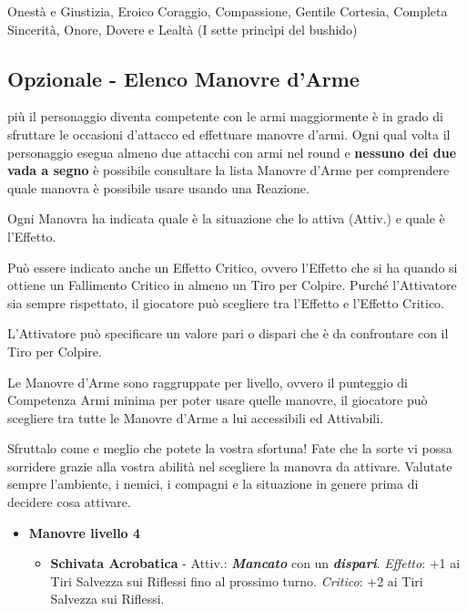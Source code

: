\begin{multicols}{2}
\begin{enfasi}{
Onestà e Giustizia, Eroico Coraggio, Compassione, Gentile Cortesia, Completa Sincerità, Onore, Dovere e Lealtà (I sette princìpi del bushido)
}\end{enfasi}


\subsection{Opzionale - Elenco Manovre d'Arme}\hypertarget{elencotalentiarmi}{}\label{elencotalentiarmi}

più il personaggio diventa competente con le armi maggiormente è in grado di sfruttare le occasioni d'attacco ed effettuare manovre d'armi. Ogni qual volta il personaggio esegua almeno due attacchi con armi nel round e \textbf{nessuno dei due vada a segno} è possibile consultare la lista Manovre d'Arme per comprendere quale manovra è possibile usare usando una Reazione.

Ogni Manovra ha indicata quale è la situazione che lo attiva (Attiv.) e quale è l'Effetto.

Può essere indicato anche un Effetto Critico, ovvero l'Effetto che si ha quando si ottiene un Fallimento Critico in almeno un Tiro per Colpire. Purché l'Attivatore sia sempre rispettato, il giocatore può scegliere tra l'Effetto e l'Effetto Critico.

L'Attivatore può specificare un valore pari o dispari che è da confrontare con il Tiro per Colpire.

Le Manovre d'Arme sono raggruppate per livello, ovvero il punteggio di Competenza Armi minima per poter usare quelle manovre, il giocatore può scegliere tra tutte le Manovre d'Arme a lui accessibili ed Attivabili.

\begin{giocatore}[Ho mancato!]
		Sfruttalo come e meglio che potete la vostra sfortuna! Fate che la sorte vi possa sorridere grazie alla vostra abilità nel scegliere la manovra da attivare. Valutate sempre l'ambiente, i nemici, i compagni e la situazione in genere prima di decidere cosa attivare.
\end{giocatore}

\begin{itemize}[leftmargin=*]
	\setlength{\itemsep}{0pt}

	\item \textbf{Manovre livello 4}
	\begin{itemize}[leftmargin=*]
		\setlength{\itemsep}{0pt}
		\item \textbf{Schivata Acrobatica} - Attiv.: \textbf{\emph{Mancato}} con un \textbf{\emph{dispari}}. \emph{Effetto}: +1 ai Tiri Salvezza sui Riflessi fino al prossimo turno. \emph{Critico}: +2 ai Tiri Salvezza sui Riflessi.


\end{itemize}
\end{itemize}
\end{multicols}
